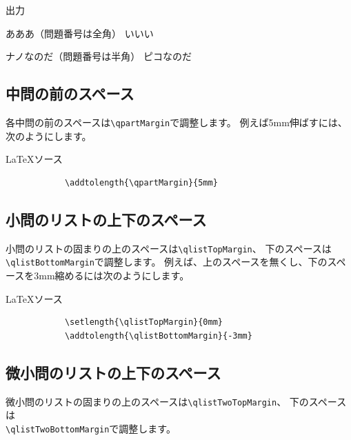 \documentclass[dvipdfmx,a4j,11pt]{jarticle}
\newenvironment{inputbox}{%
	\begin{itembox}[r]{\LaTeX ソース}
}{
	\end{itembox}
}
\newenvironment{outputbox}{%
	\begin{itembox}[r]{出力}
}{%
	\end{itembox}
}
\begin{document}
	\begin{outputbox}
		\hspace{5mm}
		\begin{minipage}{0.9\linewidth}
                        \renewcommand{\qitemFormati}[1]{%
                        		\textbf{小問 #1\arabicz{\arabic{enumi}}}
                        }
                        \renewcommand{\qitemFormatii}[1]{%
                        		\textbf{#1 その\arabic{enumii}}
                        }
			\begin{qlist}
				\qitem あああ（問題番号は全角）
				\qitem いいい
					\begin{qlist2}
						\qitem ナノなのだ（問題番号は半角）
						\qitem ピコなのだ
					\end{qlist2}
			\end{qlist}
		\end{minipage}
	\end{outputbox}


\subsection{中問の前のスペース}
	各中問の前のスペースは{\tt \verb"\qpartMargin"}で調整します。
	例えば5mm伸ばすには、次のようにします。
	\begin{inputbox}
		\begin{verbatim}
			\addtolength{\qpartMargin}{5mm}
		\end{verbatim}
	\end{inputbox}
	
\subsection{小問のリストの上下のスペース}
	小問のリストの固まりの上のスペースは{\tt \verb"\qlistTopMargin"}、
		下のスペースは\\{\tt \verb"\qlistBottomMargin"}で調整します。
		例えば、上のスペースを無くし、下のスペースを3mm縮めるには次のようにします。
	\begin{inputbox}
		\begin{verbatim}
			\setlength{\qlistTopMargin}{0mm}
			\addtolength{\qlistBottomMargin}{-3mm}
		\end{verbatim}
	\end{inputbox}

\subsection{微小問のリストの上下のスペース}
	微小問のリストの固まりの上のスペースは{\tt \verb"\qlistTwoTopMargin"}、
		下のスペースは\\{\tt \verb"\qlistTwoBottomMargin"}で調整します。
\end{document}
